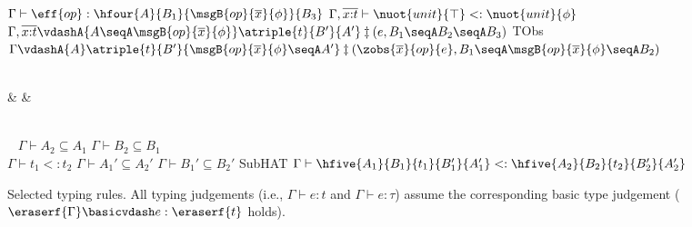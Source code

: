 \begin{figure}[!t]
{\\ \ \\ \ \\ 
\mprooftr{105mm}
{
$\Gamma \vdash \eff{op} : \hfour{A}{B_1}{\msgB{op}{\overline{x}}{\phi}}{B_3}$ \quad
$\Gamma,  \overline{x{:}t}\vdash \nuot{unit}{\top} <: \nuot{unit}{\phi}$ \quad
 $\Gamma, \overline{x{:}t} \vdashA{A \seqA \msgB{op}{\overline{x}}{\phi}} \atriple{t}{B'}{A'} \termsyn (e, B_1 \seqA B_2 \seqA B_3)$}
{TObs}
{$\Gamma \vdashA{A} \atriple{t}{B'}{\msgB{op}{\overline{x}}{\phi} \seqA A'} \termsyn (\zobs{\overline{x}}{op}{e}, B_1 \seqA \msgB{op}{\overline{x}}{\phi} \seqA B_2)$}
\\ \ 
{\small
\begin{flalign*}
 & & 
\end{flalign*}
}
\\ \
\mprooftr{80mm}
{$\Gamma \vdash A_2 \subseteq A_1$ \quad
$\Gamma \vdash B_2 \subseteq B_1$ \\
$\Gamma \vdash t_1 <: t_2$ \quad
$\Gamma \vdash A_1' \subseteq A_2'$ \quad
$\Gamma \vdash B_1' \subseteq B_2'$ \quad}
{SubHAT}
{$\Gamma \vdash \hfive{A_1}{B_1}{t_1}{B_1'}{A_1'} <: \hfive{A_2}{B_2}{t_2}{B_2'}{A_2'}$}
}
\vspace*{-.1in}
\caption{Selected typing rules. All typing judgements (i.e.,
  {\small$\Gamma \vdash e : t$} and {\small$\Gamma \vdash e : \tau$})
  assume the corresponding basic type judgement
  ({\small$\eraserf{\Gamma} \basicvdash e : \eraserf{t}$} holds).%
}
\label{fig:selected-typing-rules}
\vspace*{-.2in}
\end{figure}